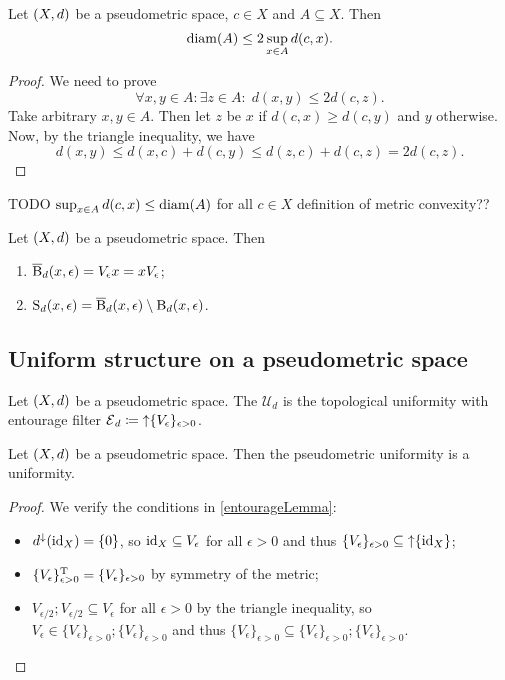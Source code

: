 \begin{lemma} \label{diameterBoundedByTwiceRadius}
Let $\sSet{X,d}$ be a pseudometric space, $c\in X$ and $A\subseteq X$. Then
\[ \operatorname{diam}(A) \leq 2\sup_{x\in A}d(c,x). \]
\end{lemma}
\begin{proof}
We need to prove
\[ \forall x,y\in A: \exists z\in A: \; d(x,y) \leq 2d(c,z). \]
Take arbitrary $x,y\in A$. Then let $z$ be $x$ if $d(c,x)\geq d(c,y)$ and $y$ otherwise. Now, by the triangle inequality, we have
\[ d(x,y) \leq d(x,c) + d(c,y) \leq d(z,c) + d(c,z) = 2d(c,z). \]
\end{proof}

TODO $\sup_{x\in A}{d(c,x)} \leq \operatorname{diam}(A)$ for all $c\in X$ definition of metric convexity??

\begin{lemma} \label{ballSphereLemma}
Let $\sSet{X,d}$ be a pseudometric space. Then
\begin{enumerate}
\item $\operatorname{\overline{B}}_d(x,\epsilon) = V_\epsilon x = xV_\epsilon$;
\item $\operatorname{S}_d(x,\epsilon) = \operatorname{\overline{B}}_d(x,\epsilon)\setminus \operatorname{B}_d(x,\epsilon)$.
\end{enumerate}
\end{lemma}


\subsection{Uniform structure on a pseudometric space}
\begin{definition}
Let $\sSet{X,d}$ be a pseudometric space. The  $\mathcal{U}_d$ is the topological uniformity with entourage filter $\operatorname{\mathcal{E}}_d \coloneqq \operatorname{\uparrow} \{V_\epsilon\}_{\epsilon > 0}$.
\end{definition}

\begin{proposition}
Let $\sSet{X,d}$ be a pseudometric space. Then the pseudometric uniformity is a uniformity.
\end{proposition}
\begin{proof}
We verify the conditions in \ref{entourageLemma}:
\begin{itemize}
\item $d^{\downarrow}(\operatorname{id}_X) = \{0\}$, so $\operatorname{id}_X \subseteq V_\epsilon$ for all $\epsilon > 0$ and thus $\{V_\epsilon\}_{\epsilon>0}\subseteq\operatorname{\uparrow}\{\operatorname{id}_X\}$;
\item $\{V_\epsilon\}_{\epsilon>0}^{\mathrm{T}} = \{V_\epsilon\}_{\epsilon>0}$ by symmetry of the metric;
\item $V_{\epsilon/2};V_{\epsilon/2} \subseteq V_\epsilon$ for all $\epsilon>0$ by the triangle inequality, so $V_\epsilon \in \{V_\epsilon\}_{\epsilon>0}; \{V_\epsilon\}_{\epsilon>0}$ and thus $\{V_\epsilon\}_{\epsilon>0} \subseteq \{V_\epsilon\}_{\epsilon>0}; \{V_\epsilon\}_{\epsilon>0}$.
\end{itemize}
\end{proof}


